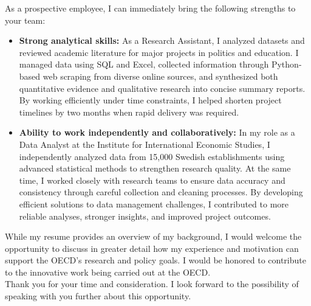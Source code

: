 \documentclass[11pt,a4paper,roman]{moderncv}
\begin{document}
As a prospective employee, I can immediately bring the following strengths to your team:
\vspace{0.5em}
\begin{itemize}
\item \textbf{Strong analytical skills:} As a Research Assistant, I analyzed datasets and reviewed academic literature for major projects in politics and education. I managed data using SQL and Excel, collected information through Python-based web scraping from diverse online sources, and synthesized both quantitative evidence and qualitative research into concise summary reports. By working efficiently under time constraints, I helped shorten project timelines by two months when rapid delivery was required.
\item \textbf{Ability to work independently and collaboratively:} In my role as a Data Analyst at the Institute for International Economic Studies, I independently analyzed data from 15,000 Swedish establishments using advanced statistical methods to strengthen research quality. At the same time, I worked closely with research teams to ensure data accuracy and consistency through careful collection and cleaning processes. By developing efficient solutions to data management challenges, I contributed to more reliable analyses, stronger insights, and improved project outcomes.
\end{itemize}

\vspace{1em}
While my resume provides an overview of my background, I would welcome the opportunity to discuss in greater detail how my experience and motivation can support the OECD's research and policy goals. I would be honored to contribute to the innovative work being carried out at the OECD.\\

\vspace{1em}
Thank you for your time and consideration. I look forward to the possibility of speaking with you further about this opportunity.

\vspace{0.5cm}


\makeletterclosing
\end{document}
